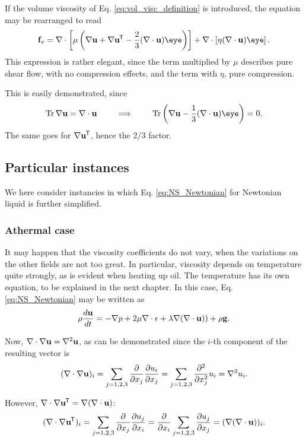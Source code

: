 If the volume viscosity of Eq. \ref{eq:vol_visc_definition} is
introduced, the equation may be rearranged to read
\begin{equation}
  \label{eq:pure_stress_pure_compression}
  \bff_\mathrm{v}=
  \nabla \cdot \left[ \mu  \left(
      \nabla\bfu + \nabla\bfu\tran  - \frac23 (\divu)  \eye
    \right)
  \right] +
  \nabla \cdot \left[ \eta (\divu) \eye \right] .
\end{equation}
This expression is rather elegant, since the term multiplied by $\mu$
describes pure shear flow, with no compression effects, and the term
with $\eta$, pure compression.

This is easily demonstrated, since
\[
  \Tr  \nabla\bfu = \divu \qquad\implies\qquad \Tr \left( \nabla\bfu -\frac13 (\divu) \eye \right) = 0 .
\]
The same goes for $ \nabla\mathbf{u}^{\mkern-1.5mu\mathsf{T}}$, hence the $2/3$ factor.


\subsection{Particular instances}

We here consider instancies in which Eq. \ref{eq:NS_Newtonian} for
Newtonian liquid is further simplified.


\subsubsection{Athermal case}

It may happen that the viscosity coefficients do not vary, when the
variations on the other fields are not too great. In particular,
viscosity depends on temperature quite strongly, as is evident when
heating up oil. The temperature has its own equation, to be explained
in the next chapter. In this case, Eq. \ref{eq:NS_Newtonian} may be
written as
\begin{equation*}
  \rho \frac{d\mathbf{u} }{dt} =
  - \nabla p +
   2 \mu \nabla \cdot  \epsilon
  + \lambda \nabla ( \nabla\cdot\mathbf{u} ) )
  + \rho \mathbf{g} .
\end{equation*}

Now, $\nabla \cdot  \nabla\mathbf{u} = \nabla^2 \mathbf{u}$, as can be demonstrated
since the $i$-th component of the resulting vector is
\[
(\nabla \cdot \nabla\mathbf{u} )_i =
\sum_{j=1,2,3} 
\frac{\partial}{\partial x_j} 
\frac{\partial u_i}{\partial x_j}
=
\sum_{j=1,2,3} 
\frac{\partial^2 }{\partial x_j^2} 
u_i = \nabla^2 u_i .
\]

However, $\nabla \cdot  \nabla\mathbf{u}^{\mkern-1.5mu\mathsf{T}} = \nabla  (\nabla\cdot\mathbf{u})$:
\[
(\nabla \cdot \nabla\mathbf{u}^{\mkern-1.5mu\mathsf{T}} )_i =
\sum_{j=1,2,3} 
\frac{\partial}{\partial x_j} 
\frac{\partial u_j}{\partial x_i}
=
\frac{\partial}{\partial x_i} 
\sum_{j=1,2,3} 
\frac{\partial u_j }{\partial x_j} 
= (\nabla  (\nabla\cdot\mathbf{u}))_i .
\]

